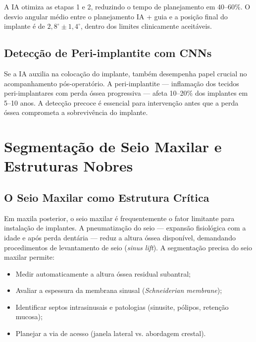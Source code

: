 A IA otimiza as etapas 1 e 2, reduzindo o tempo de planejamento em 40--60\%. O desvio angular médio entre o planejamento IA + guia e a posição final do implante é de $2,8^\circ \pm 1,4^\circ$, dentro dos limites clinicamente aceitáveis.

\subsection{Detecção de Peri-implantite com CNNs}

Se a IA auxilia na colocação do implante, também desempenha papel crucial no acompanhamento pós-operatório. A peri-implantite --- inflamação dos tecidos peri-implantares com perda óssea progressiva --- afeta 10--20\% dos implantes em 5--10 anos. A detecção precoce é essencial para intervenção antes que a perda óssea comprometa a sobrevivência do implante.


\section{Segmentação de Seio Maxilar e Estruturas Nobres}

\subsection{O Seio Maxilar como Estrutura Crítica}

Em maxila posterior, o seio maxilar é frequentemente o fator limitante para instalação de implantes. A pneumatização do seio --- expansão fisiológica com a idade e após perda dentária --- reduz a altura óssea disponível, demandando procedimentos de levantamento de seio (\textit{sinus lift}). A segmentação precisa do seio maxilar permite:
\begin{itemize}
    \item Medir automaticamente a altura óssea residual subantral;
    \item Avaliar a espessura da membrana sinusal (\textit{Schneiderian membrane});
    \item Identificar septos intrasinusais e patologias (sinusite, pólipos, retenção mucosa);
    \item Planejar a via de acesso (janela lateral vs. abordagem crestal).
\end{itemize}

